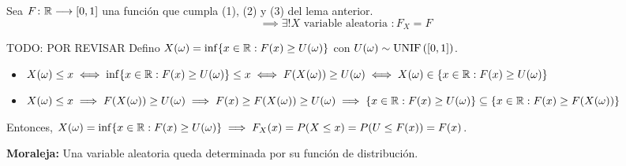 \begin{teo}
	Sea $F \colon \mathbb{R} \longrightarrow [0, 1]$ una función que cumpla (1), (2) y (3) del lema anterior.
	\[\implies \exists! X \text{ variable aleatoria } : F_X = F\]
	\begin{dem} TODO: POR REVISAR
		Defino $X(\omega) = \inf\{x\in\mathbb{R} : F(x) \geq U(\omega)\}$ con $U(\omega) \sim \operatorname{UNIF}\left([0,1]\right)$.
		\begin{itemize}
			\item $X(\omega) \leq x \iff \inf\{x\in\mathbb{R} : F(x) \geq U(\omega)\} \leq x \iff F(X(\omega)) \geq U(\omega) \iff X(\omega) \in \{x\in\mathbb{R} : F(x) \geq U(\omega)\}$
			\item $X(\omega) \leq x \implies F(X(\omega)) \geq U(\omega) \implies F(x) \geq F(X(\omega)) \geq U(\omega) \implies \{x\in\mathbb{R} : F(x) \geq U(\omega)\} \subseteq \{x\in\mathbb{R} : F(x) \geq F(X(\omega))\}$
		\end{itemize}
		Entonces, $X(\omega) = \inf\{x\in\mathbb{R} : F(x) \geq U(\omega)\} \implies F_X(x) = P(X\leq x) = P(U\leq F(x)) = F(x)$.
	\end{dem}
\end{teo}
\textbf{Moraleja:} Una variable aleatoria queda determinada por su función de distribución.